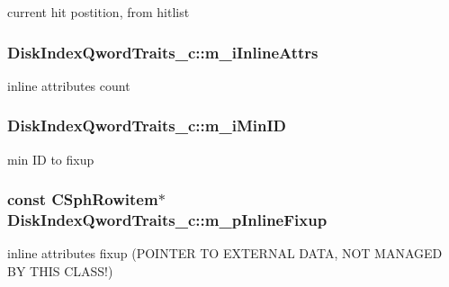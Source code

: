 current hit postition, from hitlist 

\hypertarget{classDiskIndexQwordTraits__c_ab6b9f1f3bc5131ce85e45035084cb667}{
\subsubsection[{m\-\_\-i\-Inline\-Attrs}]{ Disk\-Index\-Qword\-Traits\-\_\-c\-::m\-\_\-i\-Inline\-Attrs}}\label{classDiskIndexQwordTraits__c_ab6b9f1f3bc5131ce85e45035084cb667}


inline attributes count 

\hypertarget{classDiskIndexQwordTraits__c_a1d9de45b5d6c9c66cf8847b8b8f3ec58}{
\subsubsection[{m\-\_\-i\-Min\-I\-D}]{ Disk\-Index\-Qword\-Traits\-\_\-c\-::m\-\_\-i\-Min\-I\-D}}\label{classDiskIndexQwordTraits__c_a1d9de45b5d6c9c66cf8847b8b8f3ec58}


min I\-D to fixup 

\hypertarget{classDiskIndexQwordTraits__c_a3bd884a35f624e03487f5efdcbff1700}{
\subsubsection[{m\-\_\-p\-Inline\-Fixup}]{\setlength{\rightskip}{0pt plus 5cm}const {\bf C\-Sph\-Rowitem}$\ast$ Disk\-Index\-Qword\-Traits\-\_\-c\-::m\-\_\-p\-Inline\-Fixup}}\label{classDiskIndexQwordTraits__c_a3bd884a35f624e03487f5efdcbff1700}


inline attributes fixup (P\-O\-I\-N\-T\-E\-R T\-O E\-X\-T\-E\-R\-N\-A\-L D\-A\-T\-A, N\-O\-T M\-A\-N\-A\-G\-E\-D B\-Y T\-H\-I\-S C\-L\-A\-S\-S!) 

